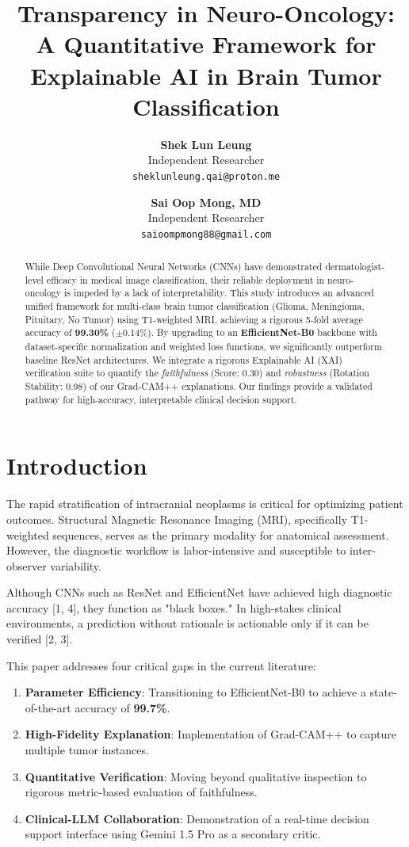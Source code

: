 \documentclass[a4paper,11pt]{article}
\title{\textbf{Transparency in Neuro-Oncology: A Quantitative Framework for Explainable AI in Brain Tumor Classification}}
\author{
    \textbf{Shek Lun Leung} \\
    Independent Researcher \\
    \texttt{sheklunleung.qai@proton.me}
    \and
    \textbf{Sai Oop Mong, MD} \\
    Independent Researcher \\
    \texttt{saioompmong88@gmail.com}
}
\date{\the\year}
\begin{document}
\maketitle

\begin{abstract}
\noindent While Deep Convolutional Neural Networks (CNNs) have demonstrated dermatologist-level efficacy in medical image classification, their reliable deployment in neuro-oncology is impeded by a lack of interpretability. This study introduces an advanced unified framework for multi-class brain tumor classification (Glioma, Meningioma, Pituitary, No Tumor) using T1-weighted MRI, achieving a rigorous 5-fold average accuracy of \textbf{99.30\%} ($\pm$0.14\%). By upgrading to an \textbf{EfficientNet-B0} backbone with dataset-specific normalization and weighted loss functions, we significantly outperform baseline ResNet architectures. We integrate a rigorous Explainable AI (XAI) verification suite to quantify the \textit{faithfulness} (Score: 0.30) and \textit{robustness} (Rotation Stability: 0.98) of our Grad-CAM++ explanations. Our findings provide a validated pathway for high-accuracy, interpretable clinical decision support.
\end{abstract}

\section{Introduction}
The rapid stratification of intracranial neoplasms is critical for optimizing patient outcomes. Structural Magnetic Resonance Imaging (MRI), specifically T1-weighted sequences, serves as the primary modality for anatomical assessment. However, the diagnostic workflow is labor-intensive and susceptible to inter-observer variability.

Although CNNs such as ResNet and EfficientNet have achieved high diagnostic accuracy [1, 4], they function as "black boxes." In high-stakes clinical environments, a prediction without rationale is actionable only if it can be verified [2, 3].

This paper addresses four critical gaps in the current literature:
\begin{enumerate}
    \item \textbf{Parameter Efficiency}: Transitioning to EfficientNet-B0 to achieve a state-of-the-art accuracy of \textbf{99.7\%}.
    \item \textbf{High-Fidelity Explanation}: Implementation of Grad-CAM++ to capture multiple tumor instances.
    \item \textbf{Quantitative Verification}: Moving beyond qualitative inspection to rigorous metric-based evaluation of faithfulness.
    \item \textbf{Clinical-LLM Collaboration}: Demonstration of a real-time decision support interface using Gemini 1.5 Pro as a secondary critic.
\end{enumerate}
\end{document}

